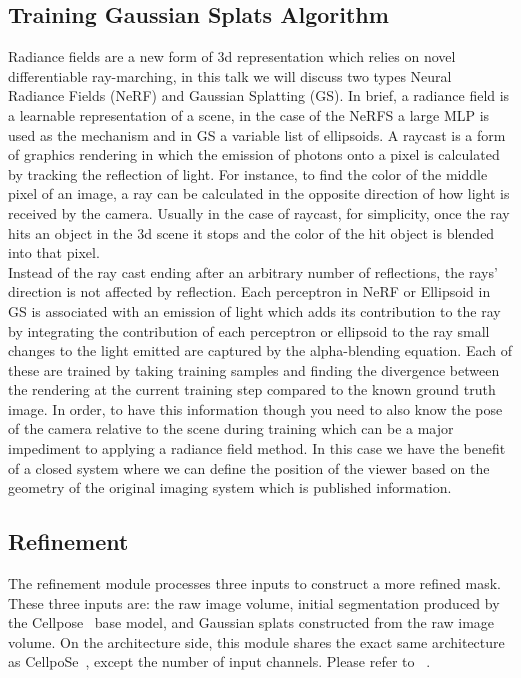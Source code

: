 \subsection{Training Gaussian Splats Algorithm}

Radiance fields are a new form of 3d representation which relies on novel differentiable ray-marching, in this talk we will discuss two types Neural Radiance Fields (NeRF) and Gaussian Splatting (GS).   In brief, a radiance field is a learnable representation of a scene, in the case of the NeRFS a large MLP is used as the mechanism and in GS a variable list of ellipsoids.  A raycast is a form of graphics rendering in which the emission of photons onto a pixel is calculated by tracking the reflection of light.  For instance, to find the color of the middle pixel of an image, a ray can be calculated in the opposite direction of how light is received by the camera.  Usually in the case of raycast, for simplicity, once the ray hits an object in the 3d scene it stops and the color of the hit object is blended into that pixel.  \\

Instead of the ray cast ending after an arbitrary number of reflections, the rays’ direction is not affected by reflection.  Each perceptron in NeRF or Ellipsoid in GS is associated with an emission of light which adds its contribution to the ray by integrating the contribution of each perceptron or ellipsoid to the ray small changes to the light emitted are captured by the alpha-blending equation. Each of these are trained by taking training samples and finding the divergence between the rendering at the current training step compared to the known ground truth image.  In order, to have this information though you need to also know the pose of the camera relative to the scene during training which can be a major impediment to applying a radiance field method. In this case we have the benefit of a closed system where we can define the position of the viewer based on the geometry of the original imaging system which is published information.  \\

\subsection{Refinement}
The refinement module processes three inputs to construct a more refined mask. These three inputs are: the raw image volume, initial segmentation produced by the Cellpose~\cite{stringer2021cellpose} base model, and Gaussian splats constructed from the raw image volume. On the architecture side, this module shares the exact same architecture as CellpoSe~\cite{stringer2021cellpose}, except the number of input channels. Please refer to ~.

